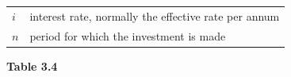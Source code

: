 \begin{itemize}[noitemsep]
{{\begin{center}
\begin{xtabular}[t]{|l|l|}
    
        
                  \begin{math}i\end{math}
                 &
    
    
        interest rate, normally the effective rate per annum%
     \tabularnewline{}
    
    
        
                  \begin{math}n\end{math}
                 &
    
    
        period for which the investment is made%
     \tabularnewline{}
    \end{xtabular}
      \end{center}
    \begin{center}{\small\bfseries Table 3.4}\end{center}
    
    \addtocounter{footnote}{-0}
    
          } %
        }{%
        }
\end{itemize}
